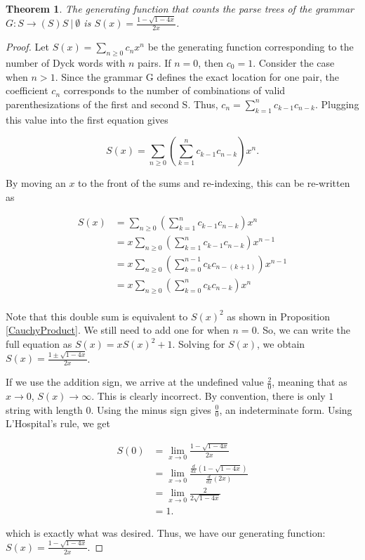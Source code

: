 \documentclass[11pt]{amsart}
\theoremstyle{plain}%
\newtheorem{thm}{Theorem}[section]
\theoremstyle{definition}
\theoremstyle{remark}
\numberwithin{equation}{thm}
\begin{document}
\begin{thm}
    The generating function that counts the parse trees of the grammar $G: S \rightarrow (S)S\ |\ \emptyset$ 
    is $S(x) = \frac{1 - \sqrt{1-4x}}{2x}$.
\end{thm}

\begin{proof}
    Let $S(x) = \sum_{n \geq 0}{c_nx^n}$ be the generating function corresponding to the number of Dyck words with $n$ pairs. If $n = 0$, then $c_0 = 1$. Consider the case when $n > 1$. Since the grammar G defines the exact location for one pair, the coefficient $c_n$ corresponds to the number of combinations of valid parenthesizations of the first and second S. Thus, $c_n = \sum_{k=1}^{n}c_{k-1}c_{n-k}$. Plugging this value into the first equation gives 

    $$S(x) = \sum_{n \geq 0} \left( \sum_{k=1}^{n}c_{k-1}c_{n-k}\right) x^n.$$

    By moving an $x$ to the front of the sums and re-indexing, this can be re-written as

    \begin{align*}
        S(x) &= \sum_{n \geq 0} \left( \sum_{k=1}^{n}c_{k-1}c_{n-k}\right) x^n\\
        &= x\sum_{n \geq 0} \left( \sum_{k=1}^{n}c_{k-1}c_{n-k}\right) x^{n-1}\\
        &= x\sum_{n \geq 0} \left( \sum_{k=0}^{n-1}c_{k}c_{n-(k+1)}\right) x^{n-1}\\
        &= x\sum_{n \geq 0} \left( \sum_{k=0}^{n}c_{k}c_{n-k}\right) x^{n}\\
    \end{align*}

    Note that this double sum is equivalent to $S(x)^2$ as shown in Proposition \ref{CauchyProduct}. We still need to add one for when $n = 0$. So, we can write the full equation as $S(x) = xS(x)^2 + 1$. Solving for $S(x)$, we obtain $S(x) = \frac{1 \pm \sqrt{1 - 4x}}{2x}$.

    If we use the addition sign, we arrive at the undefined value $\frac{2}{0}$, meaning that as $x \to 0$, $S(x) \to \infty$. This is clearly incorrect. By convention, there is only $1$ string with length $0$. Using the minus sign gives $\frac{0}{0}$, an indeterminate form. Using L'Hospital's rule, we get

    \begin{align*}
        S(0) &= \lim_{x\to0}\frac{1 - \sqrt{1 - 4x}}{2x}\\
        &= \lim_{x\to0}\frac{\frac{d}{dx}(1-\sqrt{1-4x})}{\frac{d}{dx}(2x)}\\
        &= \lim_{x\to0}\frac{2}{2\sqrt{1-4x}}\\
        &= 1.
    \end{align*}

    \noindent which is exactly what was desired. Thus, we have our generating function: $S(x) = \frac{1 - \sqrt{1-4x}}{2x}$.
\end{proof}
\end{document}
